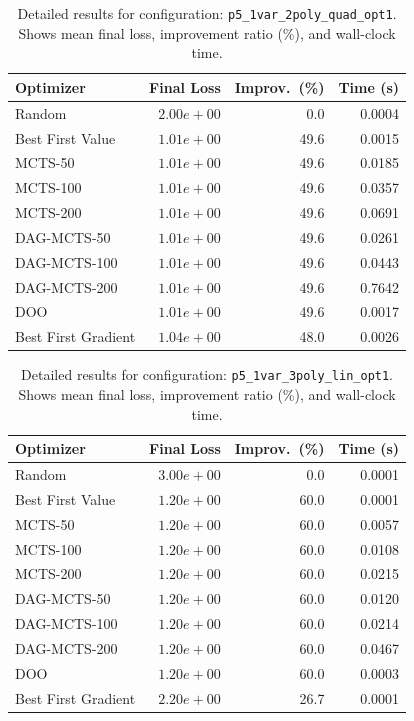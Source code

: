 \begin{table}[H]
\centering
\caption{Detailed results for configuration: \texttt{p5\_1var\_2poly\_quad\_opt1}. Shows mean final loss, improvement ratio (\%), and wall-clock time.}
\label{tab:abssum-detail-26}
\begin{tabular}{lrrr}
\toprule
Optimizer & Final Loss & Improv.~(\%) & Time (s) \\
\midrule
Random & $2.00e+00$ & 0.0 & 0.0004 \\
\hline
Best First Value & \textbf{$1.01e+00$} & 49.6 & 0.0015 \\
\hline
MCTS-50 & \textbf{$1.01e+00$} & 49.6 & 0.0185 \\
\hline
MCTS-100 & \textbf{$1.01e+00$} & 49.6 & 0.0357 \\
\hline
MCTS-200 & \textbf{$1.01e+00$} & 49.6 & 0.0691 \\
\hline
DAG-MCTS-50 & \textbf{$1.01e+00$} & 49.6 & 0.0261 \\
\hline
DAG-MCTS-100 & \textbf{$1.01e+00$} & 49.6 & 0.0443 \\
\hline
DAG-MCTS-200 & \textbf{$1.01e+00$} & 49.6 & 0.7642 \\
\hline
DOO & \textbf{$1.01e+00$} & 49.6 & 0.0017 \\
\hline
Best First Gradient & $1.04e+00$ & 48.0 & 0.0026 \\
\bottomrule
\end{tabular}
\end{table}

\begin{table}[H]
\centering
\caption{Detailed results for configuration: \texttt{p5\_1var\_3poly\_lin\_opt1}. Shows mean final loss, improvement ratio (\%), and wall-clock time.}
\label{tab:abssum-detail-27}
\begin{tabular}{lrrr}
\toprule
Optimizer & Final Loss & Improv.~(\%) & Time (s) \\
\midrule
Random & $3.00e+00$ & 0.0 & 0.0001 \\
\hline
Best First Value & \textbf{$1.20e+00$} & 60.0 & 0.0001 \\
\hline
MCTS-50 & \textbf{$1.20e+00$} & 60.0 & 0.0057 \\
\hline
MCTS-100 & \textbf{$1.20e+00$} & 60.0 & 0.0108 \\
\hline
MCTS-200 & \textbf{$1.20e+00$} & 60.0 & 0.0215 \\
\hline
DAG-MCTS-50 & \textbf{$1.20e+00$} & 60.0 & 0.0120 \\
\hline
DAG-MCTS-100 & \textbf{$1.20e+00$} & 60.0 & 0.0214 \\
\hline
DAG-MCTS-200 & \textbf{$1.20e+00$} & 60.0 & 0.0467 \\
\hline
DOO & $1.20e+00$ & 60.0 & 0.0003 \\
\hline
Best First Gradient & $2.20e+00$ & 26.7 & 0.0001 \\
\bottomrule
\end{tabular}
\end{table}

